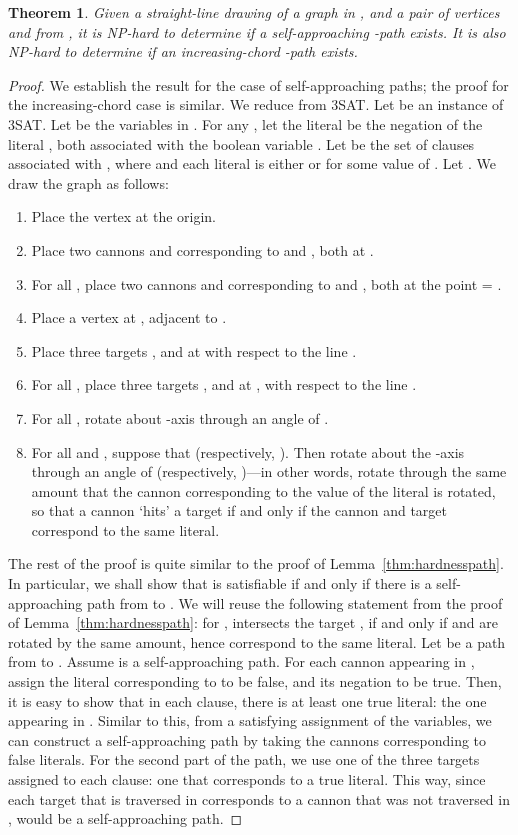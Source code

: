 \documentclass[11pt]{article}
\newtheorem{theorem}{Theorem}
\begin{document}
\begin{theorem}
\label{thm:SAPathsInGraphs}
Given a straight-line drawing of a graph  in , and a pair of vertices  and  from , it is NP-hard to determine if a self-approaching -path exists. It is also NP-hard to determine if an increasing-chord -path exists.
\end{theorem}
\begin{proof}
We establish the result for the case of self-approaching paths; the proof for the increasing-chord case is similar.  We reduce from 3SAT.  Let  be an instance of 3SAT. Let  be the variables in . For any , let the literal  be the negation of the literal , both associated with the boolean variable . Let  be the set of clauses associated with , where  and each literal  is either  or  for some value of .  Let . We draw the graph  as follows:
\begin{enumerate}
\item Place the vertex  at the origin.
\item Place two cannons  and  corresponding to  and , both at .
\item For all , place two cannons  and  corresponding to  and , both at the point  = .
\item Place a vertex  at , adjacent to .
\item Place three targets ,  and  at  with respect to the line .
\item For all , place three targets ,  and  at , with respect to the line .
\item For all , rotate  about -axis through an angle of .
\item For all  and , suppose that  (respectively, ).  Then rotate  about the -axis through an angle of  (respectively, )---in other words, rotate  through the same amount that the cannon corresponding to the value of the literal  is rotated, so that a cannon `hits' a target if and only if the cannon and target correspond to the same literal.
\end{enumerate}
The rest of the proof is quite similar to the proof of Lemma~\ref{thm:hardnesspath}.  In particular, we shall show that  is satisfiable if and only if there is a self-approaching path from  to .  We will reuse the following statement from the proof of Lemma~\ref{thm:hardnesspath}: for ,  intersects the target , if and only if  and  are rotated by the same amount, hence correspond to the same literal. Let  be a path from  to . Assume  is a self-approaching path. For each cannon  appearing in , assign the literal corresponding to  to be false, and its negation to be true. Then, it is easy to show that in each clause, there is at least one true literal: the one appearing in . Similar to this, from a satisfying assignment of the variables, we can construct a self-approaching path by taking the cannons corresponding to false literals. For the second part of the path, we use one of the three targets assigned to each clause: one that corresponds to a true literal. This way, since each target that is traversed in  corresponds to a cannon that was not traversed in ,  would be a self-approaching path.


\end{proof}
\end{document}
